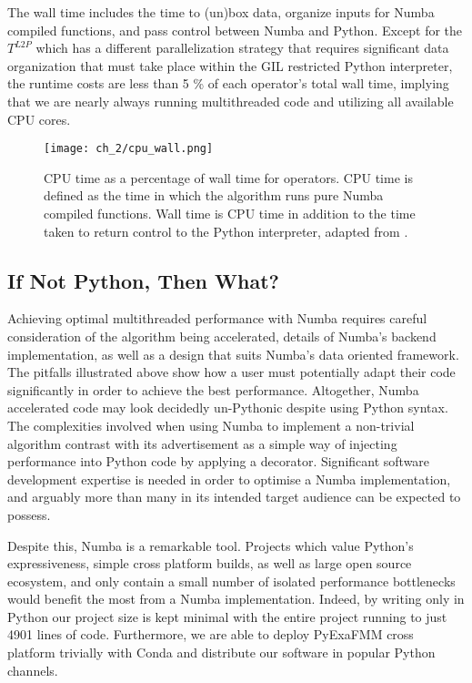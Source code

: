 The wall time includes the time to (un)box data, organize inputs for Numba compiled functions, and pass control between Numba and Python. Except for the $T^{L2P}$ which has a different parallelization strategy that requires significant data organization that must take place within the GIL restricted Python interpreter, the runtime costs are less than 5 \% of each operator's total wall time, implying that we are nearly always running multithreaded code and utilizing all available CPU cores. 

 \begin{figure}
	\centerline{\texttt{[image: ch\_2/cpu\_wall.png]}}
    \caption{CPU time as a percentage of wall time for operators. CPU time is defined as the time in which the algorithm runs pure Numba compiled functions. Wall time is CPU time in addition to the time taken to return control to the Python interpreter, adapted from \cite{kailasa2022pyexafmm}. } 
	\label{fig:sec_2_2:cpu_wall}
\end{figure}


\subsection*{If Not Python, Then What?}

Achieving optimal multithreaded performance with Numba requires careful consideration of the algorithm being accelerated, details of Numba's backend implementation, as well as a design that suits Numba's data oriented framework. The pitfalls illustrated above show how a user must potentially adapt their code significantly in order to achieve the best performance. Altogether, Numba accelerated code may look decidedly un-Pythonic despite using Python syntax. The complexities involved when using Numba to implement a non-trivial algorithm contrast with its advertisement as a simple way of injecting performance into Python code by applying a decorator. Significant software development expertise is needed in order to optimise a Numba implementation, and arguably more than many in its intended target audience can be expected to possess. 

Despite this, Numba is a remarkable tool. Projects which value Python's expressiveness, simple cross platform builds, as well as large open source ecosystem, and only contain a small number of isolated performance bottlenecks would benefit the most from a Numba implementation. Indeed, by writing only in Python our project size is kept minimal with the entire project running to just 4901 lines of code. Furthermore, we are able to deploy PyExaFMM cross platform trivially with Conda and distribute our software in popular Python channels. 

